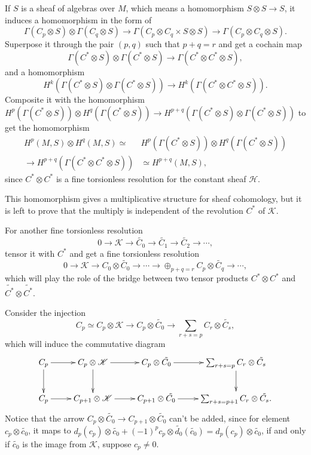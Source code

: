 \documentclass[twoside]{article}
\begin{document}
If $S$ is a sheaf of algebras over $M$, which means a homomorphism $S\otimes S\to S$, it induces a homomorphism  in the form of $$
\Gamma(C_p\otimes S)\otimes \Gamma(C_q\otimes S)\to \Gamma(C_p\otimes C_q\times S\otimes S)\to \Gamma(C_p\otimes C_q\otimes S).
$$
Superpose it through the pair $(p,q)$ such that $p+q=r$ and get a cochain map $$
\Gamma(C^*\otimes S)\otimes \Gamma(C^*\otimes S)\to \Gamma(C^*\otimes C^*\otimes S),
$$
and a  homomorphism $$
H^k(\Gamma(C^*\otimes S)\otimes \Gamma(C^*\otimes S))\to H^k(\Gamma(C^*\otimes C^*\otimes S)).
$$
Composite it with the homomorphism  $H^p(\Gamma(C^*\otimes S))\otimes H^q(\Gamma(C^*\otimes S))\to H^{p+q}(\Gamma(C^*\otimes S)\otimes \Gamma(C^*\otimes S))$ to get the homomorphism
$$\begin{aligned}
H^p(M,S)\otimes H^q(M,S)\simeq& H^p(\Gamma(C^*\otimes S))\otimes H^q(\Gamma(C^*\otimes S))\\
\to H^{p+q}(\Gamma(C^*\otimes C^*\otimes S))&\simeq H^{p+q}(M,S),
\end{aligned}
$$
since  $C^*\otimes C^*$ is a fine torsionless resolution for the constant sheaf $\mathscr{H}$.

This homomorphism gives a multiplicative structure for sheaf  cohomology, but it is left to prove that the multiply is independent of the revolution $C^*$ of $\mathscr{K}$.

For another fine torsionless resolution $$
0\to \mathscr{K}\to \tilde{C_0}\to \tilde{C_1}\to \tilde{C_2}\to \cdots,
$$
  tensor it with $C^*$ and get a fine torsionless resolution $$
0\to \mathscr{K}\to C_0\otimes \tilde{C_0}\to \cdots\to \oplus_{p+q=r}C_p\otimes \tilde{C_q}\to \cdots,
$$
which will play the role of the bridge between two tensor products  $C^*\otimes C^*$ and $\tilde{C^*}\otimes \tilde{C^*}$.

Consider the injection $$
C_p\simeq C_p\otimes \mathscr{K}\to C_p\otimes \tilde{C_0}\to \sum_{r+s=p}C_r\otimes \tilde{C_s},
$$
which will induce the commutative diagram \begin{equation*}
  \xymatrix{
C_p\ar[r]\ar[d]&C_p\otimes \mathscr{K}\ar[d]\ar[r]&C_p\otimes \tilde{C_0}\ar[r]&\sum_{r+s=p}C_r\otimes \tilde{C_s}\ar[d]\\
C_p\ar[r]&C_{p+1}\otimes \mathscr{K}\ar[r]&C_{p+1}\otimes \tilde{C_0}\ar[r]&\sum_{r+s=p+1}C_r\otimes \tilde{C_s}.\\
  }
\end{equation*}
Notice that  the arrow $C_p\otimes\tilde{C_0}\to C_{p+1}\otimes \tilde{C_0}$ can't be added, since for element $c_p\otimes \tilde{c_0}$, it maps to $d_p(c_p)\otimes \tilde{c_0}+(-1)^pc_p\otimes \tilde{d_0}(\tilde{c_0})=d_p(c_p)\otimes \tilde{c_0}$, if and only if $\tilde{c_0}$ is the  image from $\mathscr{K}$, suppose $c_p\neq 0$.
\end{document}
